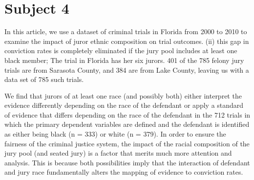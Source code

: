 \documentclass[10pt,a4paper]{article}
\begin{document}
	\section{Subject 4}
In this article, we use a dataset of criminal trials in Florida from 2000 to 2010 to examine the impact of juror ethnic composition on trial outcomes. (ii) this gap in conviction rates is completely eliminated if the jury pool includes at least one black member; The trial in Florida has her six jurors. 401 of the 785 felony jury trials are from Sarasota County, and 384 are from Lake County, leaving us with a data set of 785 such trials.
	
We find that jurors of at least one race (and possibly both) either interpret the evidence differently depending on the race of the defendant or apply a standard of evidence that differs depending on the race of the defendant in the 712 trials in which the primary dependent variables are defined and the defendant is identified as either being black (n = 333) or white (n = 379). In order to ensure the fairness of the criminal justice system, the impact of the racial composition of the jury pool (and seated jury) is a factor that merits much more attention and analysis. This is because both possibilities imply that the interaction of defendant and jury race fundamentally alters the mapping of evidence to conviction rates.
\end{document}
